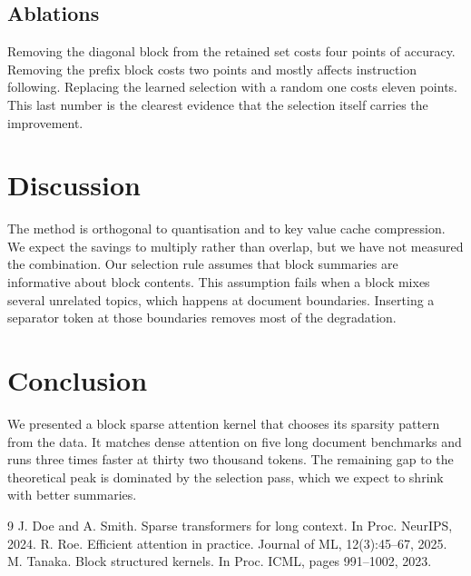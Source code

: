 \documentclass[10pt,twocolumn,a4paper]{article}
\newcommand{\s}[1]{#1}
\begin{document}
\subsection{Ablations}

\s{Removing the diagonal block from the retained set costs four points of accuracy.}
\s{Removing the prefix block costs two points and mostly affects instruction following.}
\s{Replacing the learned selection with a random one costs eleven points.}
\s{This last number is the clearest evidence that the selection itself carries the improvement.}

\section{Discussion}

\s{The method is orthogonal to quantisation and to key value cache compression.}
\s{We expect the savings to multiply rather than overlap, but we have not measured the combination.}
\s{Our selection rule assumes that block summaries are informative about block contents.}
\s{This assumption fails when a block mixes several unrelated topics, which happens at document boundaries.}
\s{Inserting a separator token at those boundaries removes most of the degradation.}

\section{Conclusion}

\s{We presented a block sparse attention kernel that chooses its sparsity pattern from the data.}
\s{It matches dense attention on five long document benchmarks and runs three times faster at thirty two thousand tokens.}
\s{The remaining gap to the theoretical peak is dominated by the selection pass, which we expect to shrink with better summaries.}

\begin{thebibliography}{9}
J. Doe and A. Smith. Sparse transformers for long context. In Proc. NeurIPS, 2024.
R. Roe. Efficient attention in practice. Journal of ML, 12(3):45--67, 2025.
M. Tanaka. Block structured kernels. In Proc. ICML, pages 991--1002, 2023.
\end{thebibliography}

\appendix
\end{document}
